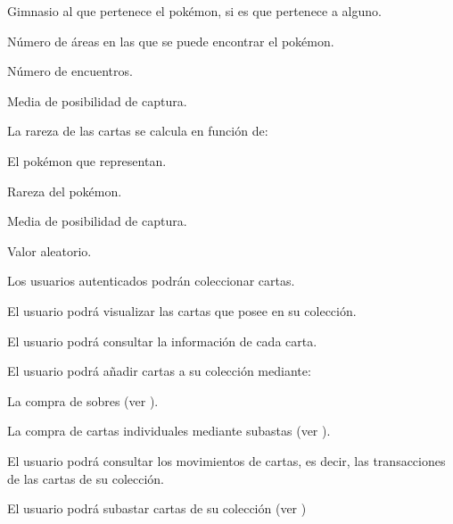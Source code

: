 \begin{RFColeccionCartas}
\begin{RFColeccionCartas}
\begin{RFColeccionCartas}
			\item Gimnasio al que pertenece el pokémon, si es que pertenece a alguno.
			\item Número de áreas en las que se puede encontrar el pokémon.
			\item Número de encuentros.
			\item Media de posibilidad de captura.
		\end{RFColeccionCartas}
		\item La rareza de las cartas se calcula en función de:
		\begin{RFColeccionCartas}
			\item El pokémon que representan.
			\item Rareza del pokémon.
			\item Media de posibilidad de captura.
			\item Valor aleatorio.
		\end{RFColeccionCartas}
	\end{RFColeccionCartas}
	\item Los usuarios autenticados podrán coleccionar cartas.\label{req_coleccion_cartas}
	\begin{RFColeccionCartas}
		\item El usuario podrá visualizar las cartas que posee en su colección.
		\item El usuario podrá consultar la información de cada carta.
		\item El usuario podrá añadir cartas a su colección mediante:
		\begin{RFColeccionCartas}
			\item La compra de sobres (ver ).
			\item La compra de cartas individuales mediante subastas (ver ).
		\end{RFColeccionCartas}
		\item El usuario podrá consultar los movimientos de cartas, es decir, las transacciones de las cartas de su colección.
		\item El usuario podrá subastar cartas de su colección (ver )
	\end{RFColeccionCartas}
\end{RFColeccionCartas}